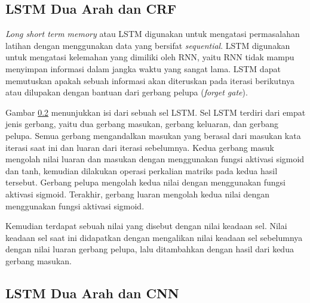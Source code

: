 \subsection{LSTM Dua Arah dan CRF}

\textit{Long short term memory} atau LSTM digunakan untuk mengatasi permasalahan latihan dengan menggunakan data yang bersifat \textit{sequential}. LSTM digunakan untuk mengatasi kelemahan yang dimiliki oleh RNN, yaitu RNN tidak mampu menyimpan informasi dalam jangka waktu yang sangat lama. LSTM dapat memutuskan apakah sebuah informasi akan diteruskan pada iterasi berikutnya atau dilupakan dengan bantuan dari gerbang pelupa (\textit{forget gate}).

Gambar \ref{} menunjukkan isi dari sebuah sel LSTM. Sel LSTM terdiri dari empat jenis gerbang, yaitu dua gerbang masukan, gerbang keluaran, dan gerbang pelupa. Semua gerbang mengandalkan masukan yang berasal dari masukan kata iterasi saat ini dan luaran dari iterasi sebelumnya. Kedua gerbang masuk mengolah nilai luaran dan masukan dengan menggunakan fungsi aktivasi sigmoid dan tanh, kemudian dilakukan operasi perkalian matriks pada kedua hasil tersebut. Gerbang pelupa mengolah kedua nilai dengan menggunakan fungsi aktivasi sigmoid. Terakhir, gerbang luaran mengolah kedua nilai dengan menggunakan fungsi aktivasi sigmoid.

Kemudian terdapat sebuah nilai yang disebut dengan nilai keadaan sel. Nilai keadaan sel saat ini didapatkan dengan mengalikan nilai keadaan sel sebelumnya dengan nilai luaran gerbang pelupa, lalu ditambahkan dengan hasil dari kedua gerbang masukan. 

\subsection{LSTM Dua Arah dan CNN}


